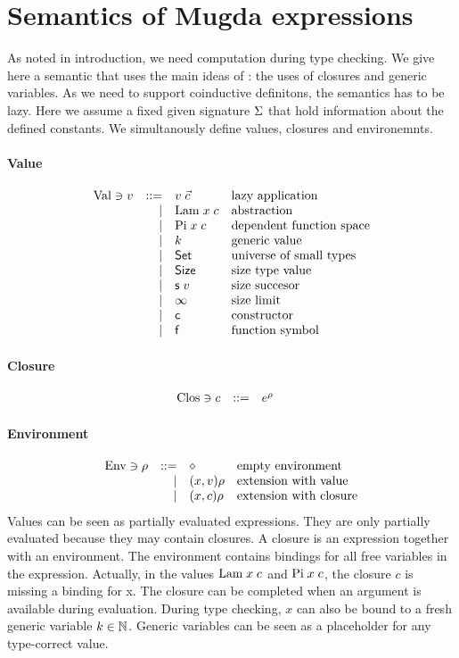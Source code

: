 \section{Semantics of Mugda expressions}
As noted in introduction, we need computation during type checking.
We give here a semantic that uses the main ideas of \cite{coquand96algorithm}:
the uses of closures and generic variables. As we need to support coinductive definitons,
the semantics has to be lazy. 
Here we assume a fixed given signature $\mathrm{\Sigma}$ that hold information about the defined constants.
We simultanously define values, closures and environemnts.
 
\paragraph{Value}
\[
\begin{array}{lrll}
\mathrm{Val} \ni v & ::= & v \; \vec{c} & \mbox{lazy application}\\
& \mid & \mathrm{Lam} \; x \; c & \mbox{abstraction}\\
& \mid & \mathrm{Pi} \; x \; c & \mbox{dependent function space}\\
& \mid & k & \mbox{generic value}\\
& \mid & \mathsf{Set} & \mbox{universe of small types} \\
& \mid & \mathsf{Size} & \mbox{size type value}\\
& \mid & \mathsf{s}\; v & \mbox{size succesor}\\
& \mid & \infty & \mbox{size limit}\\
& \mid & \mathsf{c} & \mbox{constructor}\\
& \mid & \mathsf{f} & \mbox{function symbol}\\
\end{array}
\]

\paragraph{Closure}
\[
\begin{array}{lrll}
\mathrm{Clos} \ni c & ::= & e^{\rho} & 
\end{array}
\]

\paragraph{Environment}
\[
\begin{array}{lrll}
\mathrm{Env} \ni \rho & ::= & \diamond & \mbox{empty environment}\\
& \mid & (x,v) \rho & \mbox{extension with value}\\
& \mid & (x,c) \rho & \mbox{extension with closure} 
\end{array}
\]
Values can be seen as partially evaluated expressions.
They are only partially evaluated because they may contain closures.
A closure is an expression together with an environment.
The environment contains bindings for all free variables in the expression.
Actually, in the values $\mathrm{Lam} \; x \; c$ and $\mathrm{Pi} \; x \; c$, the closure $c$ is missing 
a binding for x. The closure can be completed when an argument is available during evaluation. 
During type checking, $x$ can also be bound to a fresh generic variable $ k \in \mathbb{N}$. Generic variables can be 
seen as a placeholder for any type-correct value.
